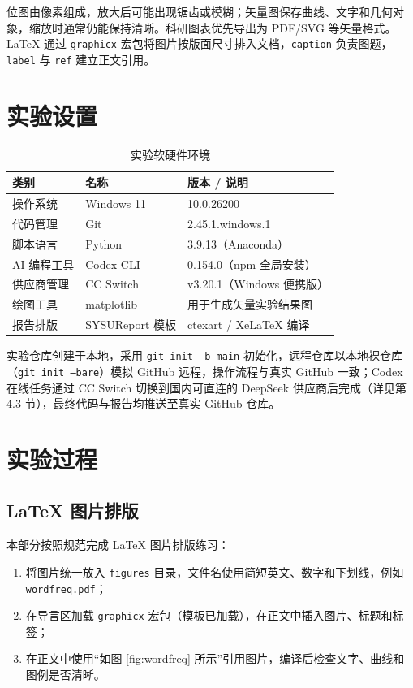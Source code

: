 \documentclass{SYSUReport}
\begin{document}
位图由像素组成，放大后可能出现锯齿或模糊；矢量图保存曲线、文字和几何对象，缩放时通常仍能保持清晰。科研图表优先导出为 PDF/SVG 等矢量格式。LaTeX 通过 \texttt{graphicx} 宏包将图片按版面尺寸排入文档，\texttt{caption} 负责图题，\texttt{label} 与 \texttt{ref} 建立正文引用。

\section{实验设置}

\begin{table}[htbp]
\centering
\caption{实验软硬件环境}
\label{tab:env}
\begin{tabular}{lll}
\toprule
\textbf{类别} & \textbf{名称} & \textbf{版本 / 说明} \\
\midrule
操作系统 & Windows 11 & 10.0.26200 \\
代码管理 & Git & 2.45.1.windows.1 \\
脚本语言 & Python & 3.9.13（Anaconda）\\
AI 编程工具 & Codex CLI & 0.154.0（npm 全局安装）\\
供应商管理 & CC Switch & v3.20.1（Windows 便携版）\\
绘图工具 & matplotlib & 用于生成矢量实验结果图 \\
报告排版 & SYSUReport 模板 & ctexart / XeLaTeX 编译 \\
\bottomrule
\end{tabular}
\end{table}

实验仓库创建于本地，采用 \texttt{git init -b main} 初始化，远程仓库以本地裸仓库（\texttt{git init --bare}）模拟 GitHub 远程，操作流程与真实 GitHub 一致；Codex 在线任务通过 CC Switch 切换到国内可直连的 DeepSeek 供应商后完成（详见第 4.3 节），最终代码与报告均推送至真实 GitHub 仓库。

\section{实验过程}

\subsection{LaTeX 图片排版}

本部分按照规范完成 LaTeX 图片排版练习：

\begin{enumerate}
    \item 将图片统一放入 \texttt{figures} 目录，文件名使用简短英文、数字和下划线，例如 \texttt{wordfreq.pdf}；
    \item 在导言区加载 \texttt{graphicx} 宏包（模板已加载），在正文中插入图片、标题和标签；
    \item 在正文中使用“如图 \ref{fig:wordfreq} 所示”引用图片，编译后检查文字、曲线和图例是否清晰。
\end{enumerate}
\end{document}
